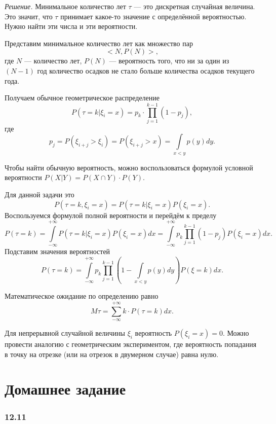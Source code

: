 \textit{Решение.} Минимальное количество лет $ \tau $ --- это дискретная случайная величина.
Это значит, что $ \tau $ принимает какое-то значение с определённой вероятностью.
Нужно найти эти числа и эти вероятности.

Представим минимальное количество лет как множество пар
$$< N, P \left( N \right) >,$$
где $N$ --- количество лет, $P \left( N \right) $ --- вероятность того,
что ни за один из $ \left( N - 1 \right) $ год количество осадков не стало больше количества осадков текущего года.

Получаем обычное геометрическое распределение
$$P \left( \left. \tau = k \right| \xi_i = x \right) =
p_k \cdot \prod \limits_{j=1}^{k-1} \left( 1-p_j \right),$$
где
$$p_j =
P \left( \xi_{i+j} > \xi_i \right) =
P \left( \xi_{i+j} > x \right) =
\int \limits_{x < y} p \left( y \right) dy.$$

Чтобы найти обычную вероятность,
можно воспользоваться формулой условной вероятности $P \left( \left. X \right| Y \right) = P \left( X \cap Y \right) \cdot P \left( Y \right)$.

Для данной задачи это
$$P \left( \tau = k, \xi_i = x \right) =
P \left( \left. \tau = k \right| \xi_i = x \right) P \left( \xi_i = x \right).$$
Воспользуемся формулой полной вероятности и перейдём к пределу
$$P \left( \tau = k \right) =
\int \limits_{- \infty }^{+ \infty } P \left( \left. \tau = k \right| \xi_i = x \right) P \left( \xi_i = x \right) dx =
\int \limits_{- \infty }^{+ \infty } p_k \prod \limits_{j=1}^{k-1} \left( 1-p_j \right) P \left( \xi_i = x \right) dx.$$
Подставим значения вероятностей
$$P \left( \tau = k \right) =
\int \limits_{- \infty }^{+ \infty } p_k \prod \limits_{j=1}^{k-1} \left( 1 - \int \limits_{x < y} p \left( y \right) dy \right) P \left( \xi = k \right) dx.$$

Математическое ожидание по определению равно
$$M \tau =
\sum \limits_{- \infty }^{+ \infty } k \cdot P \left( \tau = k \right) dx.$$

Для непрерывной случайной величины $ \xi_i$ вероятность $P \left( \xi_i = x \right) = 0$.
Можно провести аналогию с геометрическим экспериментом, где вероятность попадания в точку на отрезке (или на отрезок в двумерном случае) равна нулю.

\section*{Домашнее задание}

\subsubsection*{12.11}

